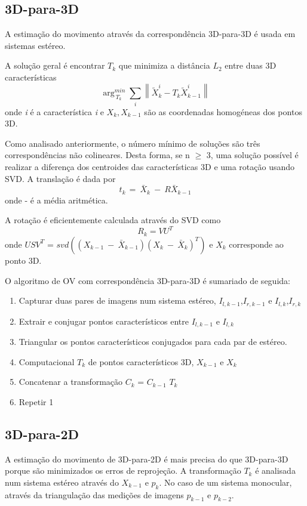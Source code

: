 \subsection{3D-para-3D}

A estimação do movimento através da correspondência 3D-para-3D é usada em sistemas estéreo. 

A solução geral é encontrar \textit{$T_k$} que minimiza a distância \textit{$L_2$} entre duas 3D características \[ \arg_{\ T_k}^{min}\sum_{i}{\left \| \tilde{X}_k^i - T_k\tilde{X}_{k-1}^i \right \|} \] 
onde \textit{i} é a característica \textit{i} e \textit{$X_{k},X_{k-1}$} são as coordenadas homogéneas dos pontos 3D. 

Como analisado anteriormente, o número mínimo de soluções são três correspondências não colineares. Desta forma, se n $\geq$ 3, uma solução possível é realizar a diferença dos centroides das características 3D e uma rotação usando SVD. A translação é dada por \[ t_{k\ }=\ {\bar{X}}_k\ -\ R{\bar{X}}_{k-1} \] onde - é a média aritmética.

A rotação é eficientemente calculada através do SVD como \[ R_k = VU^T \] onde $USV^T$ = $svd({(X_{k-1}\ -\ {\bar{X}}_{k-1})(X_k\ -\ {\bar{X}}_k)}^T)$ e \textit{$X_k$} corresponde ao ponto 3D.

O algoritmo de OV com correspondência 3D-para-3D é sumariado de seguida:
\begin{enumerate}
	\item Capturar duas pares de imagens num sistema estéreo, \textit{$I_{l,k-1}$},\textit{$I_{r,k-1}$} e \textit{$I_{l,k}$},\textit{$I_{r,k}$}
	\item Extrair e conjugar pontos característicos entre \textit{$I_{l,k-1}$} e \textit{$I_{l,k}$}
	\item Triangular os pontos característicos conjugados para cada par de estéreo.
	\item Computacional \textit{$T_k$} de pontos característicos 3D, \textit{$X_{k-1}$} e \textit{$X_k$}  
	\item Concatenar a transformação $C_k$ = $ C_{k-1}$ $T_k$
	\item Repetir 1
\end{enumerate}



\subsection{3D-para-2D}

A estimação do movimento de 3D-para-2D é mais precisa do que 3D-para-3D porque são minimizados os erros de reprojeção. A transformação \textit{$T_k$} é analisada num sistema estéreo através do \textit{$X_{k-1}$} e \textit{$p_k$}. No caso de um sistema monocular, através da triangulação das medições de imagens \textit{$p_{k-1}$} e \textit{$p_{k-2}$}. 

